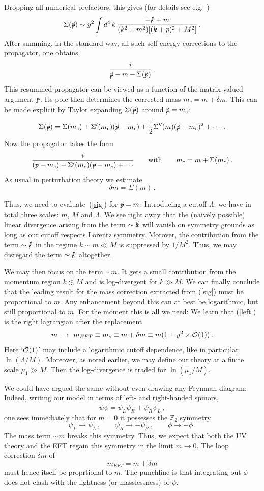 \documentclass[12pt]{article}
\newcommand{\be}{\begin{equation}}
\newcommand{\ee}{\end{equation}}
\newcommand{\ol}{\overline}
\numberwithin{equation}{section}
\begin{document}
Dropping all numerical prefactors, this gives (for details see e.g.~\cite{Srednicki:2007qs})
\be
\Sigma(\slashed{p})\sim y^2 \int d^4\,k\,\frac{-\slashed{k}+m}{(k^2+m^2)[(k+p)^2+M^2 ]}\,.\label{sig}
\ee
After summing, in the standard way, all such self-energy corrections to the propagator, one obtains 
\be
\frac{i}{\slashed{p}-m-\Sigma(\slashed{p})}\,.
\ee
This resummed propagator can be viewed as a function of the matrix-valued argument $\slashed{p}$. Its pole then determines the corrected mass $m_c=m+\delta m$. This can be made explicit by Taylor expanding $\Sigma(\slashed{p})$ around $\slashed{p}=m_c$:
\be
\Sigma(\slashed{p})=\Sigma(m_c)+\Sigma'(m_c)(\slashed{p}-m_c)+\frac{1}{2}
\Sigma''(m)(\slashed{p}-m_c)^2+\cdots\,.
\ee
Now the propagator takes the form
\be
\frac{i}{(\slashed{p}-m_c)-\Sigma'(m_c)(\slashed{p}-m_c)+\cdots}\qquad
\mbox{with}\qquad m_c=m+\Sigma(m_c)\,.
\ee
As usual in perturbation theory we estimate
\be
\delta m = \Sigma(m)\,.
\ee

Thus, we need to evaluate~(\ref{sig}) for $\slashed{p}=m$. Introducing a cutoff $\Lambda$, we have in total three scales: $m$, $M$ and $\Lambda$. We see right away that the (naively possible) linear divergence arising from the term $\sim\slashed{k}$ will vanish on symmetry grounds as long as our cutoff respects Lorentz symmetry. Morover, the contribution from the term $\sim\slashed{k}$ in the regime $k\sim m\ll M$ is suppressed by $1/M^2$. Thus, we may disregard the term $\sim \slashed{k}$ altogether. 

We may then focus on the term $\sim m$. It gets a small contribution from the momentum region $k\lesssim M$ and is log-divergent for $k\gg M$. We can finally conclude that the leading result for the mass correction extracted from (\ref{sig}) must be proportional to $m$. Any enhancement beyond this can at best be logarithmic, but still proportional to $m$. For the moment this is all we need: We learn that (\ref{left}) is the right lagrangian after the replacement
\be
m\,\,\to\,\,m_{EFT}\equiv m_c \equiv m+\delta m\equiv m(1+y^2\times {\cal O}(1))\,.
\ee
Here `${\cal O}(1)$' may include a logarithmic cutoff dependence, like in particular $\ln(\Lambda/M)$. Moreover, as noted earlier, we may define our theory at a finite scale $\mu_1\gg M$. Then the log-divergence is traded for 
$\ln(\mu_1/M)$.

We could have argued the same without even drawing any Feynman diagram: Indeed, writing our model in terms of left- and right-handed spinors,
\be
\ol{\psi}\psi=\ol{\psi}_L\psi_R+\ol{\psi}_R\psi_L\,,
\ee
one sees immediately that for $m=0$ it possesses the $\mathbb{Z}_2$ symmetry 
\be
\psi_L\to\psi_L\,,\qquad \psi_R\to-\psi_R\,,\qquad \phi\to -\phi\,.
\ee
The mass term $\sim m$ breaks this symmetry. Thus, we expect that both the UV theory and the EFT regain this symmetry in the limit $m\to 0$. The loop correction $\delta m$ of
\be
m_{EFT}=m+\delta m
\ee
must hence itself be proprtional to $m$. The punchline is that integrating out $\phi$ does not clash with the lightness (or masslessness) of $\psi$. 
\end{document}
